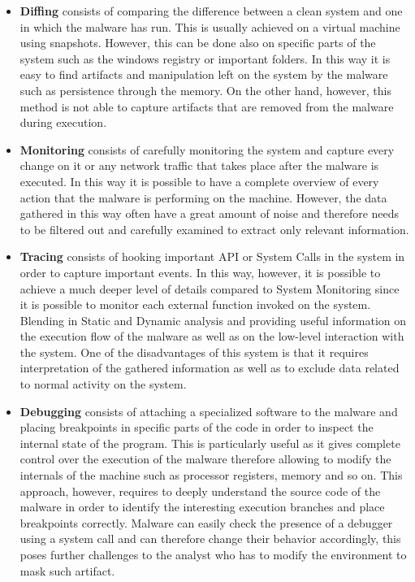 \begin{itemize}
    \item \textbf{Diffing} consists of comparing the difference between a clean system and one in which the malware has run. This is usually achieved on a virtual machine using snapshots. However, this can be done also on specific parts of the system such as the windows registry or important folders. In this way it is easy to find artifacts and manipulation left on the system by the malware such as persistence through the memory. On the other hand, however, this method is not able to capture artifacts that are removed from the malware during execution.  
    
    \item \textbf{Monitoring} consists of carefully monitoring the system and capture every change on it or any network traffic that takes place after the malware is executed. In this way it is possible to have a complete overview of every action that the malware is performing on the machine. However, the data gathered in this way often have a great amount of noise and therefore needs to be filtered out and carefully examined to extract only relevant information.
    
    \item \textbf{Tracing} consists of hooking important API or System Calls in the system in order to capture important events. In this way, however, it is possible to achieve a much deeper level of details compared to System Monitoring since it is possible to monitor each external function invoked on the system. Blending in Static and Dynamic analysis and providing useful information on the execution flow of the malware as well as on the low-level interaction with the system. One of the disadvantages of this system is that it requires interpretation of the gathered information as well as to exclude data related to normal activity on the system.
    
    \item \textbf{Debugging} consists of attaching a specialized software to the malware and placing breakpoints in specific parts of the code in order to inspect the internal state of the program. This is particularly useful as it gives complete control over the execution of the malware therefore allowing to modify the internals of the machine such as processor registers, memory and so on. This approach, however, requires to deeply understand the source code of the malware in order to identify the interesting execution branches and place breakpoints correctly. Malware can easily check the presence of a debugger using a system call and can therefore change their behavior accordingly, this poses further challenges to the analyst who has to modify the environment to mask such artifact. 
    
\end{itemize}

